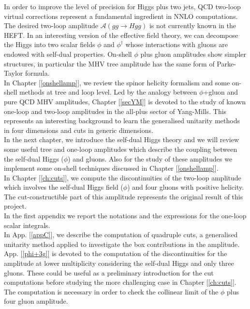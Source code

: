In order to improve the level of precision for Higgs plus two jets, QCD two-loop virtual corrections represent a fundamental ingredient in NNLO computations. The desired two-loop amplitude $\mathcal{A}(gg\rightarrow Hgg)$ is not currently known in the HEFT. In an interesting version of the effective field theory, we can decompose the Higgs into two scalar fields $\phi$ and $\phi^\dagger$ whose interactions with gluons are endowed with self-dual properties. On-shell $\phi$ plus gluon amplitudes show simpler structures, in particular the MHV tree amplitude has the same form of Parke-Taylor formula.\\

In Chapter [\ref{onshellamp}], we review the spinor helicity formalism and some on-shell methods at tree and loop level. Led by the analogy between $\phi$+gluon and pure QCD MHV amplitudes, Chapter [\ref{secYM}] is devoted to the study of known one-loop and two-loop amplitudes in the all-plus sector of Yang-Mills. This represents an interesting background to learn the generalised unitarity methods in four dimensions and cuts in generic dimensions.\\
In the next chapter, we introduce the self-dual Higgs theory and we will review some useful tree and one-loop amplitudes which describe the coupling between the self-dual Higgs ($\phi$) and gluons. Also for the study of these amplitudes we implement some on-shell techniques discussed in Chapter [\ref{onshellamp}].\\
In Chapter [\ref{ch:cuts}], we compute the discontinuities of the two-loop amplitude which involves the self-dual Higgs field ($\phi$) and four gluons with positive helicity. The cut-constructible part of this amplitude represents the original result of this project.\\
In the first appendix we report the notations and the expressions for the one-loop scalar integrals.\\
In App. [\ref{appC}], we describe the computation of quadruple cuts, a generalised unitarity method applied to investigate the box contributions in the amplitude.\\
App. [\ref{phi+3g}] is devoted to the computation of the discontinuities for the amplitude at lower multiplicity considering the self-dual Higgs and only three gluons. These could be useful as a preliminary introduction for the cut computations before studying the more challenging case in Chapter [\ref{ch:cuts}]. The computation is necessary in order to check the collinear limit of the $\phi$ plus four gluon amplitude.
